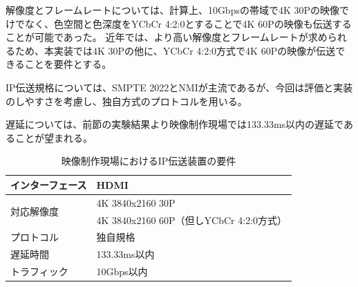 解像度とフレームレートについては、計算上、10Gbpsの帯域で4K 30Pの映像でけでなく、色空間と色深度をYCbCr 4:2:0とすることで4K 60Pの映像も伝送することが可能であった。
近年では、より高い解像度とフレームレートが求められるため、本実装では4K 30Pの他に、YCbCr 4:2:0方式で4K 60Pの映像が伝送できることを要件とする。

IP伝送規格については、SMPTE 2022とNMIが主流であるが、今回は評価と実装のしやすさを考慮し、独自方式のプロトコルを用いる。

遅延については、前節の実験結果より映像制作現場では133.33ms以内の遅延であることが望まれる。

\begin{table}[htbp]
  \caption{映像制作現場におけるIP伝送装置の要件}
  \label{tb:ip-youken}
  \begin{center}
  \begin{tabular}{l|l}
    \hline
    インターフェース   & HDMI \\\hline
    \multirow{2}{*}{対応解像度} & 4K 3840x2160 30P \\\cline{2-2}
                              & 4K 3840x2160 60P（但しYCbCr 4:2:0方式）  \\\hline
    プロトコル        & 独自規格 \\\hline
    遅延時間          & 133.33ms以内 \\\hline
    トラフィック      & 10Gbps以内 \\\hline
  \end{tabular}\end{center}
\end{table}

